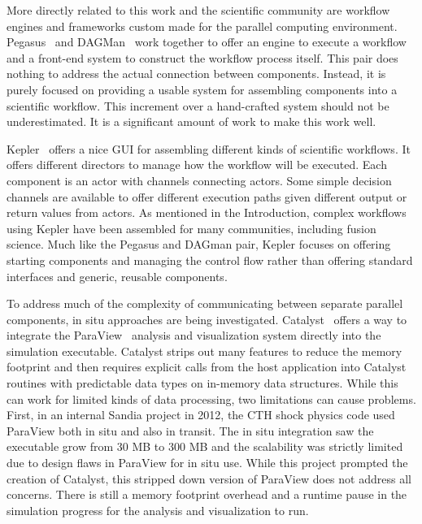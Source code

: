 \documentclass[conference]{IEEEtran}
\begin{document}
More directly related to this work and the scientific community are workflow
engines and frameworks custom made for the parallel computing environment.
Pegasus~\cite{mullender:pegasus} and DAGMan~\cite{Malewicz:2006:dagman} work
together to offer an engine to execute a workflow and a front-end system to
construct the workflow process itself. This pair does nothing to address the
actual connection between components. Instead, it is purely focused on
providing a usable system for assembling components into a scientific workflow.
This increment over a hand-crafted system should not be underestimated. It is a
significant amount of work to make this work well.

Kepler~\cite{bertram:2006:kepler} offers a nice GUI for assembling different
kinds of scientific workflows. It offers different directors to manage how the
workflow will be executed. Each component is an actor with channels connecting
actors. Some simple decision channels are available to offer different
execution paths given different output or return values from actors. As
mentioned in the Introduction, complex workflows using Kepler have been
assembled for many communities, including fusion science. Much like the Pegasus
and DAGman pair, Kepler focuses on offering starting components and managing
the control flow rather than offering standard interfaces and generic, reusable
components.

To address much of the complexity of communicating between separate parallel
components, in situ approaches are being investigated.
Catalyst~\cite{karimabadi:2013:catalyst} offers a way to integrate the
ParaView~\cite{Moreland:2008:paraview} analysis and visualization system
directly into the simulation executable. Catalyst strips out many features to
reduce the memory footprint and then requires explicit calls from the host
application into Catalyst routines with predictable data types on in-memory
data structures. While this can work for limited kinds of data processing, two
limitations can cause problems. First, in an internal Sandia project in 2012,
the CTH shock physics code used ParaView both in situ and also in transit. The
in situ integration saw the executable grow from 30 MB to 300 MB and the
scalability was strictly limited due to design flaws in ParaView for in situ
use. While this project prompted the creation of Catalyst, this stripped down
version of ParaView does not address all concerns. There is still a memory
footprint overhead and a runtime pause in the simulation progress for the
analysis and visualization to run.
\end{document}
